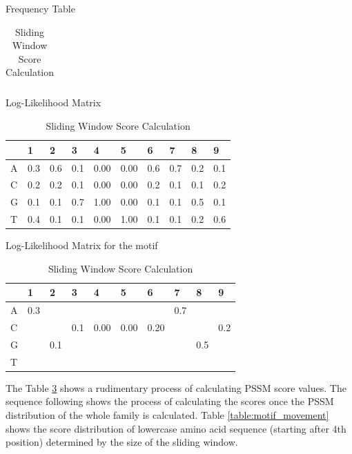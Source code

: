 \begin{table}
\begin{subtable}[]{Frequency Table}
\begin{tabular}{|l|l|l|l|l|l|l|l|l|l|}
    \end{tabular}
  \end{subtable}

  \begin{subtable}[]
    {Log-Likelihood Matrix}
    \begin{tabular}{|l|l|l|l|l|l|l|l|l|l|}
    \hline 

        & 1 & 2 & 3 & 4 & 5 & 6 & 7 & 8 & 9 \\ \hline
    A & 0.3 & 0.6 & 0.1 & 0.00 & 0.00 & 0.6 & 0.7 & 0.2 & 0.1 \\ \hline
    C & 0.2 & 0.2 & 0.1 & 0.00 & 0.00 & 0.2 & 0.1 & 0.1 & 0.2 \\ \hline
    G & 0.1 & 0.1 & 0.7 & 1.00 & 0.00 & 0.1 & 0.1 & 0.5 & 0.1 \\ \hline
    T & 0.4 & 0.1 & 0.1 & 0.00 & 1.00 & 0.1 & 0.1 & 0.2 & 0.6 \\ \hline
    
    \end{tabular}
  \end{subtable}

  \begin{subtable}[]
    {Log-Likelihood Matrix for the motif}
    \begin{tabular}{|l|l|l|l|l|l|l|l|l|l|}
    \hline 
    
        & 1 & 2 & 3 & 4 & 5 & 6 & 7 & 8 & 9 \\ \hline
    A & 0.3 &  &  &  &  &  & 0.7 &  &  \\ \hline
    C &  &  & 0.1 & 0.00 & 0.00 & 0.20 &  &  & 0.2 \\ \hline
    G &  & 0.1 &  &  &  &  &  & 0.5 &  \\ \hline
    T &  &  &  &  &  &  &  &  &  \\ \hline
    
    \end{tabular}
    \caption{Sliding Window Score Calculation}
    \label{table:motif_movement}
  \end{subtable}
  
  \label{table:PSSM_Analysis} 
\end{table}

The Table \ref{table:PSSM_Analysis} shows a rudimentary process of calculating PSSM score values. The sequence following shows the process of calculating the scores once the PSSM distribution of the whole family is calculated. Table \ref{table:motif_movement} shows the score distribution of lowercase amino acid sequence (starting after 4th position) determined by the size of the sliding window.

